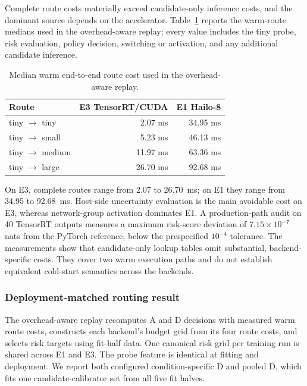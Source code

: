 \documentclass[a4paper,review,12pt]{elsarticle}
\begin{document}
Complete route costs materially exceed candidate-only inference costs, and the dominant source depends on the accelerator. Table~\ref{tab:routes} reports the warm-route medians used in the overhead-aware replay; every value includes the tiny probe, risk evaluation, policy decision, switching or activation, and any additional candidate inference.

\begin{table}[H]
\centering
\caption{Median warm end-to-end route cost used in the overhead-aware replay.}
\label{tab:routes}
\begin{tabular}{@{}lrr@{}}
\toprule
Route & E3 TensorRT/CUDA & E1 Hailo-8 \\
\midrule
tiny $\rightarrow$ tiny & 2.07 ms & 34.95 ms \\
tiny $\rightarrow$ small & 5.23 ms & 46.13 ms \\
tiny $\rightarrow$ medium & 11.97 ms & 63.36 ms \\
tiny $\rightarrow$ large & 26.70 ms & 92.68 ms \\
\bottomrule
\end{tabular}
\end{table}

On E3, complete routes range from 2.07 to 26.70~ms; on E1 they range from 34.95 to 92.68~ms. Host-side uncertainty evaluation is the main avoidable cost on E3, whereas network-group activation dominates E1. A production-path audit on 40 TensorRT outputs measures a maximum risk-score deviation of $7.15\times10^{-7}$ nats from the PyTorch reference, below the prespecified $10^{-4}$ tolerance. The measurements show that candidate-only lookup tables omit substantial, backend-specific costs. They cover two warm execution paths and do not establish equivalent cold-start semantics across the backends.

\subsubsection{Deployment-matched routing result}

The overhead-aware replay recomputes A and D decisions with measured warm route costs, constructs each backend's budget grid from its four route costs, and selects risk targets using fit-half data. One canonical risk grid per training run is shared across E1 and E3. The probe feature is identical at fitting and deployment. We report both configured condition-specific D and pooled D, which fits one candidate-calibrator set from all five fit halves.
\end{document}
